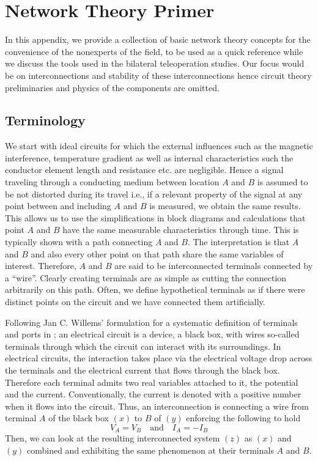 \chapter{Network Theory Primer}
\label{chap:apdxnetwork}

In this appendix, we provide a collection of basic network theory concepts for the convenience of the nonexperts of the field, 
to be used as a quick reference while we discuss the tools used in the bilateral teleoperation studies. Our focus would be on 
interconnections and stability of these interconnections hence circuit theory preliminaries and physics of the components are omitted.

\section{Terminology}
We start with ideal circuits for which the external influences such as the magnetic interference, temperature gradient as well as 
internal characteristics such the conductor element length and resistance etc. are negligible. Hence a signal traveling through a 
conducting medium between location $A$ and $B$ is assumed to be not distorted during its travel i.e., if a relevant property 
of the signal at any point between and including $A$ and $B$ is measured, we obtain the same results. This allows us to use the 
simplifications in block diagrams and calculations that point $A$ and $B$ have the same measurable characteristics through time. 
This is typically shown with a path connecting $A$ and $B$. The interpretation is that $A$ and $B$ and also every other point on 
that path share the same variables of interest. Therefore, $A$ and $B$ are said to be interconnected terminals connected by a 
\enquote{wire}. Clearly creating terminals are as simple as cutting the connection arbitrarily on this path. Often, 
we define hypothetical terminals as if there were distinct points on the circuit and we have connected them artificially. 

Following Jan C. Willems' formulation for a systematic definition of terminals and ports in \cite{willemsCSM}; an electrical 
circuit is a device, a black box, with wires so-called terminals through which the circuit can interact with its surroundings. 
In electrical circuits, the interaction takes place via the electrical voltage drop across the terminals and the electrical 
current that flows through the black box. Therefore each terminal admits two real variables attached to it, the potential and 
the current. Conventionally, the current is denoted with a positive number when it flows into the circuit. Thus, an 
interconnection is connecting a wire from terminal $A$ of the black box $(x)$ to $B$ of $(y)$ enforcing the following to hold
\[
V_A = V_B \quad \text{and} \quad I_A=-I_B
\]
Then, we can look at the resulting interconnected system $(z)$ as $(x)$ and $(y)$ combined and exhibiting the same phenomenon 
at their terminals $A$ and $B$. 

